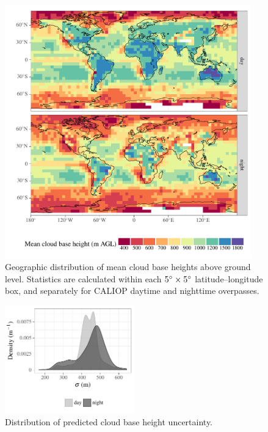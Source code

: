 \documentclass[amt,manuscript]{copernicus}\usepackage[]{graphicx}\usepackage[]{color}
\newenvironment{knitrout}{}{} %
\begin{document}
\begin{figure}
  \centering
\begin{knitrout}
\color{fgcolor}

{\centering \includegraphics[width=0.95\textwidth]{figure/method-cbase-base-1} 

}



\end{knitrout}
  \caption{Geographic distribution of mean cloud base heights above ground
    level.  Statistics are calculated within each $5^{\circ}\times 5^{\circ}$
    latitude--longitude box, and separately for CALIOP daytime and nighttime
    overpasses.}
  \label{fig:geo}
\end{figure}

\begin{figure}
  \centering
\begin{knitrout}
\color{fgcolor}

{\centering \includegraphics[width=0.5\textwidth]{figure/method-cbase-rmse-1} 

}



\end{knitrout}
  \caption{Distribution of predicted cloud base height uncertainty.}
  \label{fig:uncertainty}
\end{figure}
\end{document}
